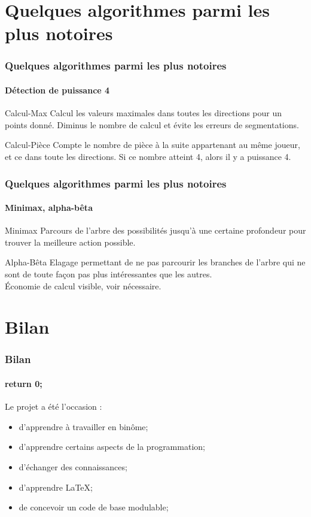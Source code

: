 \documentclass{beamer}
\begin{document}
    \section{Quelques algorithmes parmi les plus notoires}
    \begin{frame}
    \frametitle{Quelques algorithmes parmi les plus notoires}
    \framesubtitle{Détection de puissance 4}
    	\begin{block}{Calcul-Max}
		    Calcul les valeurs maximales dans toutes les directions pour un points donné. Diminus le nombre de calcul et évite les erreurs de segmentations.\\
	\end{block}
	\begin{block}{Calcul-Pièce}
		    Compte le nombre de pièce à la suite appartenant au même joueur, et ce dans toute les directions. Si ce nombre atteint 4, alors il y a puissance 4.\\
	\end{block}
    \end{frame}




    \begin{frame}
    \frametitle{Quelques algorithmes parmi les plus notoires}
    \framesubtitle{Minimax, alpha-bêta}
        \begin{block}{Minimax}
            Parcours de l'arbre des possibilités jusqu'à une certaine profondeur pour trouver la meilleure action possible.
        \end{block}
        \begin{block}{Alpha-Bêta}
            Elagage permettant de ne pas parcourir les branches de l'arbre qui ne sont de toute façon pas plus intéressantes que les autres.\\
            Économie de calcul visible, voir nécessaire.
        \end{block}
    \end{frame}



    \section{Bilan}
    \begin{frame}
    \frametitle{Bilan}
    \framesubtitle{return 0;}
        Le projet a été l'occasion :
        \begin{itemize}
            \item d'apprendre à travailler en binôme;
            \item d'apprendre certains aspects de la programmation;
            \item d'échanger des connaissances;
            \item d'apprendre LaTeX;
            \item de concevoir un code de base modulable;
        \end{itemize}

    \end{frame}



\end{document}
